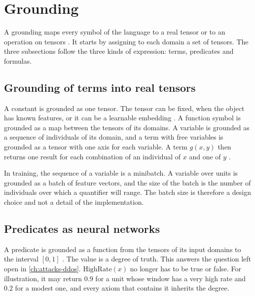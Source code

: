 \section{Grounding}
\label{sec:grounding}

A grounding maps every symbol of the language to a real tensor or to an
operation on tensors \citep{badreddine2022ltn}. It starts by assigning to each
domain a set of tensors. The three subsections follow the three kinds of
expression: terms, predicates and formulas.

\subsection{Grounding of terms into real tensors}
\label{sec:grounding-terms}

A constant is grounded as one tensor. The tensor can be fixed, when the object
has known features, or it can be a learnable embedding
\citep{badreddine2022ltn}. A function symbol is grounded as a map between the
tensors of its domains. A variable is grounded as a sequence of individuals of
its domain, and a term with free variables is grounded as a tensor with one
axis for each variable. A term $g(x,y)$ then returns one result for each
combination of an individual of $x$ and one of $y$ \citep{badreddine2022ltn}.

In training, the sequence of a variable is a minibatch. A variable over
units is grounded as a batch of feature vectors, and the size of the batch
is the number of individuals over which a quantifier will range. The batch
size is therefore a design choice and not a detail of the implementation.

\subsection{Predicates as neural networks}
\label{sec:grounding-predicates}

A predicate is grounded as a function from the tensors of its input domains to
the interval $[0,1]$ \citep{badreddine2022ltn}. The value is a degree of
truth. This answers the question left open in \cref{ch:attacks-ddos}.
$\mathrm{HighRate}(x)$ no longer has to be true or false. For illustration, it
may return $0.9$ for a unit whose window has a very high rate and $0.2$ for a
modest one, and every axiom that contains it inherits the degree.

